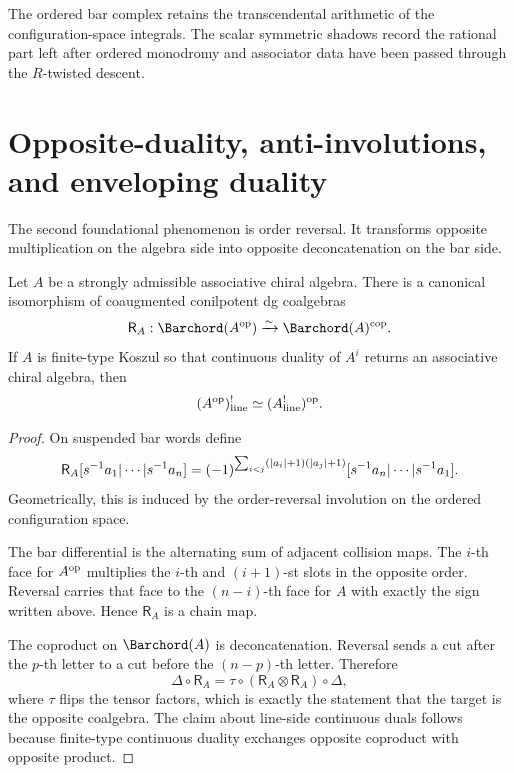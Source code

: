 \begin{remark}
The ordered bar complex retains the transcendental arithmetic of the
configuration-space integrals. The scalar symmetric shadows record the
rational part left after ordered monodromy and associator data have
been passed through the $R$-twisted descent.
\end{remark}

\section{Opposite-duality, anti-involutions, and enveloping duality}
\label{sec:opposite}

The second foundational phenomenon is order reversal. It transforms opposite multiplication on the
algebra side into opposite deconcatenation on the bar side.

\begin{theorem}
\ClaimStatusProvedHere
\label{thm:opposite}
Let $A$ be a strongly admissible associative chiral algebra. There is a canonical isomorphism of
coaugmented conilpotent dg coalgebras
\[
\mathsf{R}_A:\Barchord(A^{\op})\xrightarrow{\sim}\Barchord(A)^{\cop}.
\]
If $A$ is finite-type Koszul so that continuous duality of $A^i$ returns an associative
chiral algebra, then
\[
(A^{\mathrm{op}})^!_{\mathrm{line}}\simeq (A^!_{\mathrm{line}})^{\mathrm{op}}.
\]
\end{theorem}

\begin{proof}
On suspended bar words define
\[
\mathsf{R}_A[s^{-1} a_1|\cdots|s^{-1} a_n]
=
(-1)^{\sum_{i<j}(|a_i|+1)(|a_j|+1)}
[s^{-1} a_n|\cdots|s^{-1} a_1].
\]
Geometrically, this is induced by the order-reversal involution on the ordered configuration space.

The bar differential is the alternating sum of adjacent collision maps. The $i$-th face for
$A^{\mathrm{op}}$ multiplies the $i$-th and $(i+1)$-st slots in the opposite order. Reversal carries that
face to the $(n-i)$-th face for $A$ with exactly the sign written above. Hence $\mathsf{R}_A$ is a
chain map.

The coproduct on $\Barchord(A)$ is deconcatenation. Reversal sends a cut after the $p$-th letter to a
cut before the $(n-p)$-th letter. Therefore
\[
\Delta\circ\mathsf{R}_A
=
\tau\circ(\mathsf{R}_A\otimes\mathsf{R}_A)\circ\Delta,
\]
where $\tau$ flips the tensor factors, which is exactly the statement that the target is the
opposite coalgebra. The claim about line-side continuous duals follows because finite-type
continuous duality exchanges opposite coproduct with opposite product.
\end{proof}

